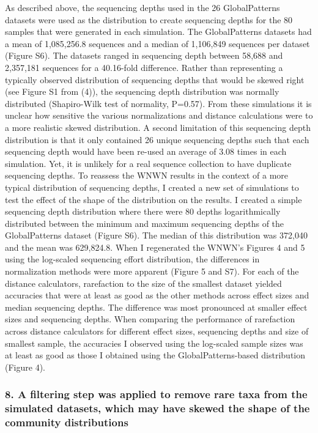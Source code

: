 \documentclass[
]{article}
\begin{document}
As described above, the sequencing depths used in the 26 GlobalPatterns
datasets were used as the distribution to create sequencing depths for
the 80 samples that were generated in each simulation. The
GlobalPatterns datasets had a mean of 1,085,256.8 sequences and a median
of 1,106,849 sequences per dataset (Figure S6). The datasets ranged in
sequencing depth between 58,688 and 2,357,181 sequences for a 40.16-fold
difference. Rather than representing a typically observed distribution
of sequencing depths that would be skewed right (see Figure S1 from
(4)), the sequencing depth distribution was normally distributed
(Shapiro-Wilk test of normality, P=0.57). From these simulations it is
unclear how sensitive the various normalizations and distance
calculations were to a more realistic skewed distribution. A second
limitation of this sequencing depth distribution is that it only
contained 26 unique sequencing depths such that each sequencing depth
would have been re-used an average of 3.08 times in each simulation.
Yet, it is unlikely for a real sequence collection to have duplicate
sequencing depths. To reassess the WNWN results in the context of a more
typical distribution of sequencing depths, I created a new set of
simulations to test the effect of the shape of the distribution on the
results. I created a simple sequencing depth distribution where there
were 80 depths logarithmically distributed between the minimum and
maximum sequencing depths of the GlobalPatterns dataset (Figure S6). The
median of this distribution was 372,040 and the mean was 629,824.8. When
I regenerated the WNWN's Figures 4 and 5 using the log-scaled sequencing
effort distribution, the differences in normalization methods were more
apparent (Figure 5 and S7). For each of the distance calculators,
rarefaction to the size of the smallest dataset yielded accuracies that
were at least as good as the other methods across effect sizes and
median sequencing depths. The difference was most pronounced at smaller
effect sizes and sequencing depths. When comparing the performance of
rarefaction across distance calculators for different effect sizes,
sequencing depths and size of smallest sample, the accuracies I observed
using the log-scaled sample sizes was at least as good as those I
obtained using the GlobalPatterns-based distribution (Figure 4).

\hypertarget{a-filtering-step-was-applied-to-remove-rare-taxa-from-the-simulated-datasets-which-may-have-skewed-the-shape-of-the-community-distributions}{%
\subsubsection{8. A filtering step was applied to remove rare taxa from
the simulated datasets, which may have skewed the shape of the community
distributions}\label{a-filtering-step-was-applied-to-remove-rare-taxa-from-the-simulated-datasets-which-may-have-skewed-the-shape-of-the-community-distributions}}
\end{document}
